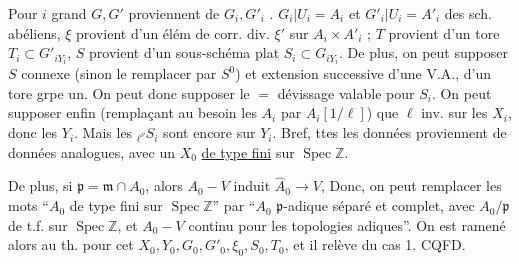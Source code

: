 Pour $i$ grand $G,G'$ proviennent de $G_i,G'_i$ .
$G_i|U_i=A_i$ et $G'_i|U_i=A'_i$ des sch. abéliens, $\xi$ provient d'un élém de corr. div. $\xi'$ sur $A_i\times A'_i$ ; $T$ provient d'un tore $T_i\subset G'_{iY_i}$, $S$ provient d'un sous-schéma plat $S_i\subset G_{iY_i}$.
De plus,   on peut  supposer $S$ connexe  (sinon le remplacer par $S^0$) et  extension  successive d'une V.A., d'un tore  grpe un. On peut donc supposer le $=$ dévissage valable pour $S_i$.
On peut supposer enfin (remplaçant au besoin les $A_i$ par $A_i[1/\ell]$) que $\ell$ inv. sur les $X_i$, donc les $Y_i$. Mais les ${}_{\ell^\nu}S_i$ sont encore  sur $Y_i$. Bref, ttes les données proviennent de données analogues, avec un  $X_0$  \uline{de type fini} sur $\operatorname{Spec}\mathbb Z$.

De plus, si $\mathfrak p=\mathfrak m\cap A_0$, alors $A_0\mathbin{-}V$ induit $\widehat A_0\longrightarrow V$,  Donc, on peut remplacer les mots ``$A_0$ de type fini sur $\operatorname{Spec}\mathbb Z$'' par ``$A_0$ $\mathfrak p$-adique séparé et complet, avec $A_0/\mathfrak p$ de t.f. sur $\operatorname{Spec}\mathbb Z$, et $A_0\mathbin{-}V$ continu pour les topologies adiques''. On est ramené alors au th. pour cet $X_0,Y_0,G_0,G'_0,\xi_0,S_0,T_0$, et il relève du cas 1.
\hfill CQFD.

